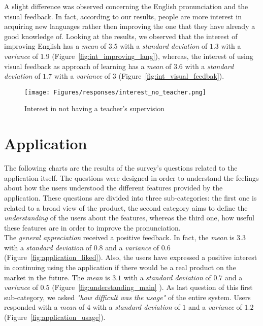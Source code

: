 \noindent A slight difference was observed concerning the English pronunciation and the visual feedback. In fact, according to our results, people are more interest in acquiring new languages rather then improving the one that they have already a good knowledge of. Looking at the results, we observed that the interest of improving English has a \textit{mean} of $3.5$ with a \textit{standard deviation} of $1.3$ with a \textit{variance} of $1.9$ (Figure~\ref{fig:int_improving_lang}), whereas, the interest of using visual feedback as approach of learning has a \textit{mean} of $3.6$ with a \textit{standard deviation} of $1.7$ with a \textit{variance} of $3$ (Figure~\ref{fig:int_visual_feedbak}).

\begin{figure}[!ht]
	\centering
	\texttt{[image: Figures/responses/interest\_no\_teacher.png]}
	\caption{Interest in not having a teacher's supervision}
	\label{fig:int_no_teacher}
\end{figure}

\section{Application}
\label{sub:Application}
\noindent The following charts are the results of the survey's questions related to the application itself. The questions were designed in order to understand the feelings about how the users understood the different features provided by the application. These questions are divided into three sub-categories: the first one is related to a broad view of the product, the second category aims to define the \textit{understanding} of the users about the features, whereas the third one, how useful these features are in order to improve the pronunciation. \\

\noindent The \textit{general appreciation} received a positive feedback. In fact, the \textit{mean} is $3.3$ with a \textit{standard deviation} of $0.8$ and a \textit{variance} of $0.6$ (Figure~\ref{fig:application_liked}). Also, the users have expressed a positive interest in continuing using the application if there would be a real product on the market in the future. The \textit{mean} is $3.1$ with a \textit{standard deviation} of $0.7$ and a \textit{variance} of $0.5$ (Figure~\ref{fig:understanding_main} ). As last question of this first sub-category, we asked \textit{"how difficult was the usage"} of the entire system. Users responded with a \textit{mean} of $4$ with a \textit{standard deviation} of $1$ and a \textit{variance} of $1.2$ (Figure~\ref{fig:application_usage}).

